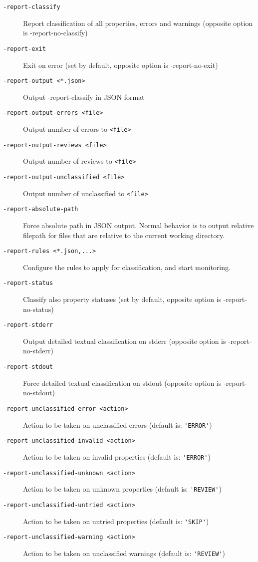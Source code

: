 \begin{description}
\item[\tt -report-classify] Report classification of all properties, errors and
  warnings (opposite option is -report-no-classify)
\item[\tt -report-exit] Exit on error (set by default, opposite option is
  -report-no-exit)
\item[\tt -report-output <*.json>]  Output -report-classify in JSON format
\item[\tt -report-output-errors <file>]  Output number of errors to \verb+<file>+
\item[\tt -report-output-reviews <file>]  Output number of reviews to \verb+<file>+
\item[\tt -report-output-unclassified <file>]  Output number of unclassified to \verb+<file>+
\item[\tt -report-absolute-path] Force absolute path in JSON output. Normal behavior is to
  output relative filepath for files that are relative to the current working directory.
\item[\tt -report-rules <*.json,...>]  Configure the rules to apply for
  classification, and start monitoring.
\item[\tt -report-status] Classify also property statuses (set by default, opposite
  option is -report-no-status)
\item[\tt -report-stderr] Output detailed textual classification on stderr
  (opposite option is -report-no-stderr)
\item[\tt -report-stdout] Force detailed textual classification on stdout
  (opposite option is -report-no-stdout)
\item[\tt -report-unclassified-error <action>]
  Action to be taken on unclassified
  errors (default is: \verb+'ERROR'+)
\item[\tt -report-unclassified-invalid <action>]
  Action to be taken on invalid
  properties (default is: \verb+'ERROR'+)
\item[\tt -report-unclassified-unknown <action>]
  Action to be taken on unknown
  properties (default is: \verb+'REVIEW'+)
\item[\tt -report-unclassified-untried <action>]
  Action to be taken on untried
  properties (default is: \verb+'SKIP'+)
\item[\tt -report-unclassified-warning <action>]
  Action to be taken on unclassified
  warnings (default is: \verb+'REVIEW'+)
\end{description}

